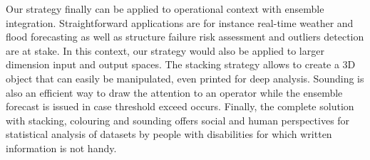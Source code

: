 Our strategy finally can be applied to operational context with ensemble integration. Straightforward applications are for instance real-time weather and flood forecasting as well as structure failure risk assessment and outliers detection are at stake. In this context, our strategy would also be applied to larger dimension input and output spaces. The stacking strategy allows to create a 3D object that can easily be manipulated, even printed for deep analysis. Sounding is also an efficient way to draw the attention to an operator while the ensemble forecast is issued in case threshold exceed occurs. Finally, the complete solution with stacking, colouring and sounding offers social and human perspectives for statistical analysis of datasets by people with disabilities for which written information is not handy.  




